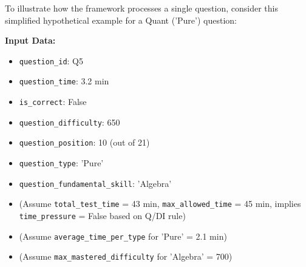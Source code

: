 \documentclass{article}
\begin{document}
To illustrate how the framework processes a single question, consider this simplified hypothetical example for a Quant ('Pure') question:

\textbf{Input Data:}
\begin{itemize}
    \item \texttt{question\_id}: Q5
    \item \texttt{question\_time}: 3.2 min
    \item \texttt{is\_correct}: False
    \item \texttt{question\_difficulty}: 650
    \item \texttt{question\_position}: 10 (out of 21)
    \item \texttt{question\_type}: 'Pure'
    \item \texttt{question\_fundamental\_skill}: 'Algebra'
    \item (Assume \texttt{total\_test\_time} = 43 min, \texttt{max\_allowed\_time} = 45 min, implies \texttt{time\_pressure} = False based on Q/DI rule)
    \item (Assume \texttt{average\_time\_per\_type} for 'Pure' = 2.1 min)
    \item (Assume \texttt{max\_mastered\_difficulty} for 'Algebra' = 700)
\end{itemize}
\end{document}

